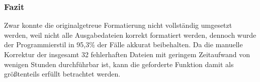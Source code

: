 \subsubsection{Fazit}

Zwar konnte die originalgetreue Formatierung nicht vollständig umgesetzt werden, weil nicht alle Ausgabedateien korrekt formatiert werden, dennoch wurde der Programmierstil in 95,3\% der Fälle akkurat beibehalten. Da die manuelle Korrektur der insgesamt 32 fehlerhaften Dateien mit geringem Zeitaufwand von wenigen Stunden durchführbar ist, kann die geforderte Funktion damit als größtenteils erfüllt betrachtet werden.
